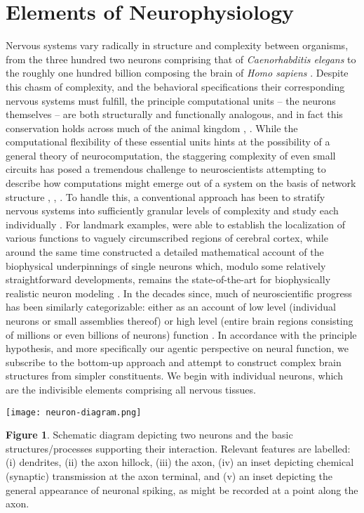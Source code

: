 \documentclass[12pt, oneside]{report}
\newcommand{\1}[1]{\mathbbm{1}_{\{#1\}}}
\theoremstyle{definition}
\newtheorem{fig}[theorem]{Figure}
\begin{document}
\section{Elements of Neurophysiology}\label{sec4}
Nervous systems vary radically in structure and complexity between
organisms, from the three hundred two neurons comprising that of {\it
Caenorhabditis elegans} \cite{White_Southgate_Thomson_Brenner_1986} to the
roughly one hundred billion composing the brain of {\it Homo sapiens}
\cite{Herculano-Houzel_2009}. Despite this chasm of complexity, and the
behavioral specifications their corresponding nervous systems must fulfill, the
principle computational units -- the neurons themselves -- are both structurally
and functionally analogous, and in fact this conservation holds across much of
the animal kingdom \cite{Moroz_2009}, \cite{Sterling_Laughlin_2015}. While the
computational flexibility of these essential units hints at the possibility of a
general theory of neurocomputation, the staggering complexity of even small
circuits has posed a tremendous challenge to neuroscientists attempting to
describe how computations might emerge out of a system on the basis of network
structure \cite{Daur_Nadim_Bucher_2016}, \cite{Gjorgjieva_Drion_Marder_2016},
\cite{Haspel_et_al}. To handle this, a conventional approach has been to
stratify nervous systems into sufficiently granular levels of complexity and
study each individually \cite{Parker_2022}. For landmark examples,
\cite{Penfield_Jasper_1954} were able to establish the localization of various
functions to vaguely circumscribed regions of cerebral cortex, while around the
same time \cite{Hodgkin_Huxley_1952} constructed a detailed mathematical account
of the biophysical underpinnings of single neurons which, modulo some relatively
straightforward developments, remains the state-of-the-art for biophysically
realistic neuron modeling \cite{Ermentrout_Terman_2010}. In the decades since,
much of neuroscientific progress has been similarly categorizable: either as an
account of low level (individual neurons or small assemblies thereof) or high
level (entire brain regions consisting of millions or even billions of neurons)
function \cite{Parker_2022}. In accordance with the principle hypothesis, and
more specifically our agentic perspective on neural function, we subscribe to
the bottom-up approach and attempt to construct complex brain structures from
simpler constituents. We begin with individual neurons, which are the
indivisible elements comprising all nervous tissues.\\[5pt]
\begin{center}
    \texttt{[image: neuron-diagram.png]}
\end{center}
\begin{fig}\label{fig1} Schematic diagram depicting two neurons and the basic
    structures/processes supporting their interaction. Relevant features are
    labelled: (i) dendrites, (ii) the axon hillock, (iii) the axon, (iv) an
    inset depicting chemical (synaptic) transmission at the axon terminal, and
    (v) an inset depicting the general appearance of neuronal spiking, as might
    be recorded at a point along the axon.
\end{fig}
\end{document}

